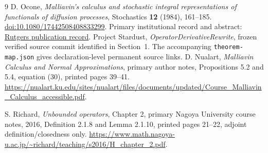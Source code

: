 \documentclass[11pt]{article}
\begin{document}
\begin{thebibliography}{9}
 D. Ocone, \emph{Malliavin's calculus and stochastic integral
representations of functionals of diffusion processes}, Stochastics
\textbf{12} (1984), 161--185.
\href{https://doi.org/10.1080/17442508408833299}{doi:10.1080/17442508408833299}.
Primary institutional record and abstract:
\href{https://www.researchwithrutgers.org/en/publications/malliavins-calculus-and-stochastic-integral-representations-of-fu/}{Rutgers publication record}.
 Project Stardust, \emph{OperatorDerivativeRewrite}, frozen
verified source commit identified in Section~1. The accompanying
\texttt{theorem-map.json} gives declaration-level permanent source links.
 D. Nualart,
\emph{Malliavin Calculus and Normal Approximations}, primary author notes,
Propositions 5.2 and 5.4, equation (30), printed pages 39--41.
\url{https://nualart.ku.edu/sites/nualart/files/documents/updated/Course_Malliavin_Calculus_accessible.pdf}.

 S. Richard, \emph{Unbounded operators}, Chapter 2,
primary Nagoya University course notes, 2016, Definition 2.1.8 and
Lemma 2.1.10, printed pages 21--22, adjoint definition/closedness only.
\url{https://www.math.nagoya-u.ac.jp/~richard/teaching/s2016/H_chapter_2.pdf}.
\end{thebibliography}
\end{document}
